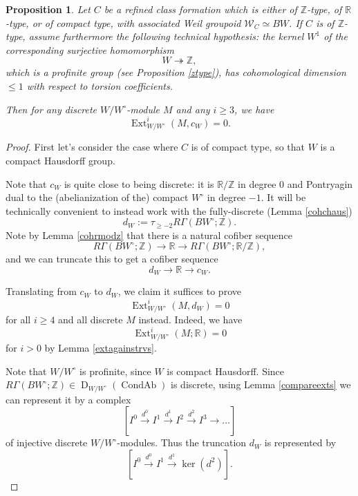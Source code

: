 \documentclass[12pt]{article}
\newtheorem{proposition}[theorem]{Proposition}
\theoremstyle{definition}
\newcommand{\on}{\operatorname}
\newcommand{\mc}{\mathcal}
\newcommand{\mbb}{\mathbb}
\begin{document}
\begin{proposition}\label{extvanishing}
Let $C$ be a refined class formation which is either of $\mbb{Z}$-type, of $\mbb{R}$-type, or of compact type, with associated Weil groupoid $\mc{W}_C\simeq BW$.  If $C$ is of $\mbb{Z}$-type, assume furthermore the following technical hypothesis: the kernel $W^1$ of the corresponding surjective homomorphism
$$W \twoheadrightarrow \mbb{Z},$$
which is a profinite group (see Proposition \ref{ztype}), has cohomological dimension $\leq 1$ with respect to torsion coefficients.


Then for any discrete $W/W^\circ$-module $M$ and any $i\geq 3$, we have
$$\on{Ext}^i_{W/W^\circ}(M,c_W)=0.$$
\end{proposition}
\begin{proof}
First let's consider the case where $C$ is of compact type, so that $W$ is a compact Hausdorff group.

Note that $c_W$ is quite close to being discrete: it is $\mbb{R}/\mbb{Z}$ in degree $0$ and Pontryagin dual to the (abelianization of the) compact $W^\circ$ in degree $-1$.  It will be technically convenient to instead work with the fully-discrete (Lemma \ref{cohchaus})
$$d_W := \tau_{\geq -2}R\Gamma(BW^\circ;\mbb{Z}).$$
Note by Lemma \ref{cohrmodz} that there is a natural cofiber sequence
$$R\Gamma(BW^\circ;\mbb{Z}) \to \mbb{R} \to R\Gamma(BW^\circ;\mbb{R}/\mbb{Z}),$$
and we can truncate this to get a cofiber sequence
$$d_W \to \mbb{R} \to c_W.$$

Translating from $c_W$ to $d_W$, we claim it suffices to prove
$$\on{Ext}_{W/W^\circ}^i(M,d_W)=0$$
for all $i\geq 4$ and all discrete $M$ instead.  Indeed, we have
$$\on{Ext}^i_{W/W^\circ}(M;\mbb{R})=0$$
for $i>0$ by Lemma \ref{extagainstrvs}.

Note that $W/W^\circ$ is profinite, since $W$ is compact Hausdorff.  Since $R\Gamma(BW^\circ;\mbb{Z})\in\on{D}_{W/W^\circ}(\on{CondAb})$ is discrete, using Lemma \ref{compareexts} we can represent it by a complex
$$[I^0 \overset{d^0}{\rightarrow} I^1 \overset{d^1}{\rightarrow} I^2 \overset{d^2}{\rightarrow} I^3 \to \dots]$$
of injective discrete $W/W^\circ$-modules.  Thus the truncation $d_W$ is represented by
$$[I^0 \overset{d^0}{\rightarrow} I^1 \overset{d^1}{\rightarrow} \on{ker}(d^2)].$$


\end{proof}
\end{document}
